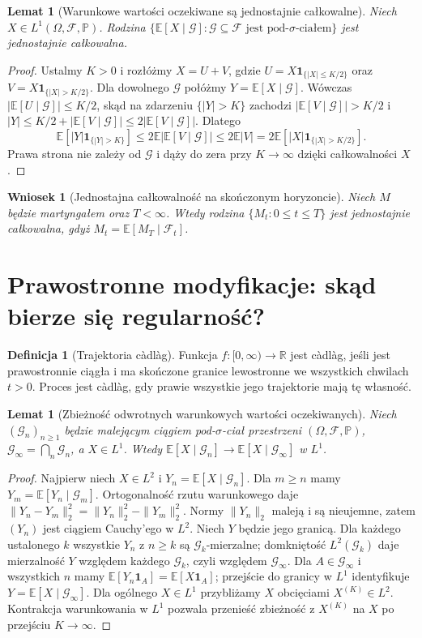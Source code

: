 \documentclass[11pt,a4paper,oneside]{report}
\numberwithin{equation}{chapter}
\theoremstyle{plain}
\newtheorem{lemat}[twierdzenie]{Lemat}
\newtheorem{wniosek}[twierdzenie]{Wniosek}
\theoremstyle{definition}
\newtheorem{definicja}{Definicja}[chapter]
\theoremstyle{remark}
\newcommand{\R}{\mathbb{R}}
\newcommand{\Prob}{\mathbb{P}}
\newcommand{\E}{\mathbb{E}}
\newcommand{\calF}{\mathcal{F}}
\newcommand{\calG}{\mathcal{G}}
\newcommand{\ind}[1]{\mathbf{1}_{#1}}
\begin{document}
\begin{lemat}[Warunkowe wartości oczekiwane są jednostajnie całkowalne]
Niech $X\in L^1(\Omega,\calF,\Prob)$. Rodzina
$\{\E[X\mid\calG]:\calG\subseteq\calF\text{ jest pod-}\sigma\text{-ciałem}\}$
jest jednostajnie całkowalna.
\end{lemat}
\begin{proof}
Ustalmy $K>0$ i rozłóżmy $X=U+V$, gdzie
$U=X\ind{\{|X|\le K/2\}}$ oraz
$V=X\ind{\{|X|>K/2\}}$. Dla dowolnego $\calG$
połóżmy $Y=\E[X\mid\calG]$. Wówczas
$|\E[U\mid\calG]|\le K/2$, skąd na zdarzeniu
$\{|Y|>K\}$ zachodzi $|\E[V\mid\calG]|>K/2$
i $|Y|\le K/2+|\E[V\mid\calG]|\le2|\E[V\mid\calG]|$.
Dlatego
\[
\E[|Y|\ind{\{|Y|>K\}}]
\le2\E|\E[V\mid\calG]|
\le2\E|V|
=2\E[|X|\ind{\{|X|>K/2\}}].
\]
Prawa strona nie zależy od $\calG$ i dąży do zera
przy $K\to\infty$ dzięki całkowalności $X$.
\end{proof}

\begin{wniosek}[Jednostajna całkowalność na skończonym horyzoncie]
Niech $M$ będzie martyngałem oraz $T<\infty$.
Wtedy rodzina $\{M_t:0\le t\le T\}$ jest jednostajnie
całkowalna, gdyż $M_t=\E[M_T\mid\calF_t]$.
\end{wniosek}

\section{Prawostronne modyfikacje: skąd bierze się regularność?}
\begin{definicja}[Trajektoria c\`adl\`ag]
Funkcja $f:[0,\infty)\to\R$ jest c\`adl\`ag, jeśli
jest prawostronnie ciągła i ma skończone granice lewostronne
we wszystkich chwilach $t>0$. Proces jest c\`adl\`ag,
gdy prawie wszystkie jego trajektorie mają tę własność.
\end{definicja}

\begin{lemat}[Zbieżność odwrotnych warunkowych wartości oczekiwanych]
Niech $(\calG_n)_{n\ge1}$ będzie malejącym ciągiem
pod-$\sigma$-ciał przestrzeni $(\Omega,\calF,\Prob)$,
$\calG_\infty=\bigcap_n\calG_n$, a $X\in L^1$.
Wtedy
$\E[X\mid\calG_n]\to\E[X\mid\calG_\infty]$ w $L^1$.
\end{lemat}
\begin{proof}
Najpierw niech $X\in L^2$ i $Y_n=\E[X\mid\calG_n]$.
Dla $m\ge n$ mamy $Y_m=\E[Y_n\mid\calG_m]$.
Ortogonalność rzutu warunkowego daje
$\|Y_n-Y_m\|_2^2=\|Y_n\|_2^2-\|Y_m\|_2^2$.
Normy $\|Y_n\|_2$ maleją i są nieujemne, zatem
$(Y_n)$ jest ciągiem Cauchy'ego w $L^2$. Niech $Y$
będzie jego granicą. Dla każdego ustalonego $k$ wszystkie
$Y_n$ z $n\ge k$ są $\calG_k$-mierzalne; domkniętość
$L^2(\calG_k)$ daje mierzalność $Y$ względem każdego
$\calG_k$, czyli względem $\calG_\infty$.
Dla $A\in\calG_\infty$ i wszystkich $n$ mamy
$\E[Y_n\ind A]=\E[X\ind A]$; przejście do granicy
w $L^1$ identyfikuje $Y=\E[X\mid\calG_\infty]$.
Dla ogólnego $X\in L^1$ przybliżamy $X$ obcięciami
$X^{(K)}\in L^2$. Kontrakcja warunkowania w $L^1$
pozwala przenieść zbieżność z $X^{(K)}$ na $X$ po
przejściu $K\to\infty$.
\end{proof}
\end{document}
